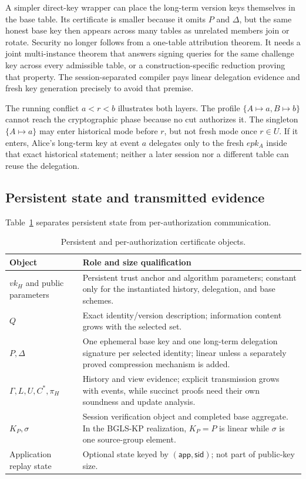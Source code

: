 \documentclass[11pt]{article}
\theoremstyle{definition}
\begin{document}
A simpler direct-key wrapper can place the long-term version keys themselves in the base table.  Its certificate is smaller because it omits $P$ and $\Delta$, but the same honest base key then appears across many tables as unrelated members join or rotate.  Security no longer follows from a one-table attribution theorem.  It needs a joint multi-instance theorem that answers signing queries for the same challenge key across every admissible table, or a construction-specific reduction proving that property.  The session-separated compiler pays linear delegation evidence and fresh key generation precisely to avoid that premise.

The running conflict $a<r<b$ illustrates both layers.  The profile $\{A\mapsto a,B\mapsto b\}$ cannot reach the cryptographic phase because no cut authorizes it.  The singleton $\{A\mapsto a\}$ may enter historical mode before $r$, but not fresh mode once $r\in U$.  If it enters, Alice's long-term key at event $a$ delegates only to the fresh $epk_A$ inside that exact historical statement; neither a later session nor a different table can reuse the delegation.

\subsection{Persistent state and transmitted evidence}
Table~\ref{tab:sizes} separates persistent state from per-authorization communication.
\begin{table}[t]
\centering
\caption{Persistent and per-authorization certificate objects.}
\label{tab:sizes}
\begin{tabularx}{\linewidth}{@{}p{.25\linewidth}X@{}}
\toprule
Object & Role and size qualification\\
\midrule
$vk_H$ and public parameters & Persistent trust anchor and algorithm parameters; constant only for the instantiated history, delegation, and base schemes.\\
$Q$ & Exact identity/version description; information content grows with the selected set.\\
$P,\Delta$ & One ephemeral base key and one long-term delegation signature per selected identity; linear unless a separately proved compression mechanism is added.\\
$\Gamma,L,U,C^*,\pi_H$ & History and view evidence; explicit transmission grows with events, while succinct proofs need their own soundness and update analysis.\\
$K_P,\sigma$ & Session verification object and completed base aggregate.  In the BGLS-KP realization, $K_P=P$ is linear while $\sigma$ is one source-group element.\\
Application replay state & Optional state keyed by $(\mathsf{app},\mathsf{sid})$; not part of public-key size.\\
\bottomrule
\end{tabularx}
\end{table}
\end{document}
